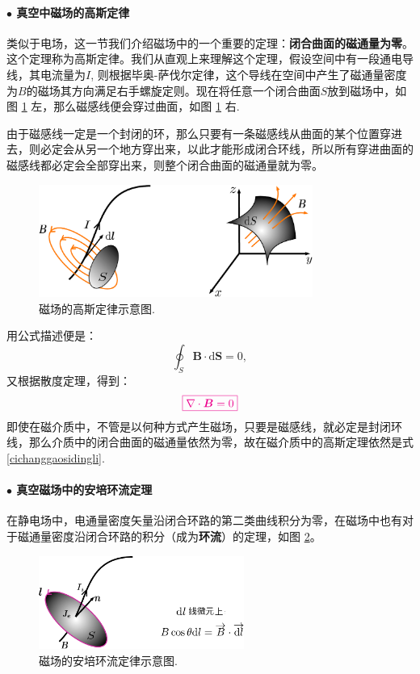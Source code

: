 \documentclass[10pt,reqno, final]{ctexart}
\begin{document}
\paragraph{$\bullet$ 真空中磁场的高斯定律} 类似于电场，这一节我们介绍磁场中的一个重要的定理：\textbf{闭合曲面的磁通量为零}。这个定理称为高斯定律。我们从直观上来理解这个定理，假设空间中有一段通电导线，其电流量为$I$, 则根据毕奥-萨伐尔定律，这个导线在空间中产生了磁通量密度为$B$的磁场其方向满足右手螺旋定则。现在将任意一个闭合曲面$S$放到磁场中，如图 \ref{cichanggaosidingli} 左，那么磁感线便会穿过曲面，如图 \ref{cichanggaosidingli} 右. 

由于磁感线一定是一个封闭的环，那么只要有一条磁感线从曲面的某个位置穿进去，则必定会从另一个地方穿出来，以此才能形成闭合环线，所以所有穿进曲面的磁感线都必定会全部穿出来，则整个闭合曲面的磁通量就为零。

\begin{figure}[htp]
	\centering
	\includegraphics[width=0.8\textwidth]{Figures/cichanggaosidingli}
	\caption {磁场的高斯定律示意图. }
	\label{cichanggaosidingli}
\end{figure}

用公式描述便是：
\begin{equation}
\displaystyle \oint_S \bm{B}\cdot \mathrm{d}\bm{S} = 0,
\end{equation}
又根据散度定理，得到：
\begin{equation}\label{cichanggaosidingli}
\color{magenta}\boxed{\nabla\cdot\bm{B} = 0}
\end{equation}
即使在磁介质中，不管是以何种方式产生磁场，只要是磁感线，就必定是封闭环线，那么介质中的闭合曲面的磁通量依然为零，故在磁介质中的高斯定理依然是式\eqref{cichanggaosidingli}. 

\paragraph{$\bullet$ 真空磁场中的安培环流定理} 在静电场中，电通量密度矢量沿闭合环路的第二类曲线积分为零，在磁场中也有对于磁通量密度沿闭合环路的积分（成为\textbf{环流}）的定理，如图 \ref{cichanghuanliudingli}。
\begin{figure}[htp]
	\centering
	\includegraphics[width=0.6\textwidth]{Figures/cichanghuanliudingli}
	\caption {磁场的安培环流定律示意图. }
	\label{cichanghuanliudingli}
\end{figure}
\end{document}
